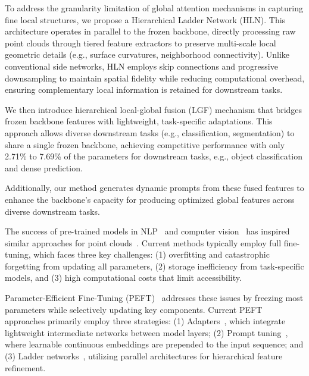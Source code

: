  To address the granularity limitation of global attention mechanisms in capturing fine local structures, we propose a Hierarchical Ladder Network (HLN). This architecture operates in parallel to the frozen backbone, directly processing raw point clouds through tiered feature extractors to preserve multi-scale local geometric details (e.g., surface curvatures, neighborhood connectivity). Unlike conventional side networks, HLN employs skip connections and progressive downsampling to maintain spatial fidelity while reducing computational overhead, ensuring complementary local information is retained for downstream tasks. 

 We then introduce hierarchical local-global fusion (LGF) mechanism that bridges frozen backbone features with lightweight, task-specific adaptations. This approach allows diverse downstream tasks (e.g., classification, segmentation) to share a single frozen backbone, achieving competitive performance with only 2.71\% to 7.69\% of the parameters for downstream tasks, e.g., object classification and dense prediction.

Additionally, our method generates dynamic prompts from these fused features to enhance the backbone’s capacity for producing optimized global features across diverse downstream tasks.

The success of pre-trained models in NLP~\cite{devlin2018bert, brown2020language} and computer vision~\cite{he2020momentum, chen2020improved} has inspired similar approaches for point clouds~\cite{pang2022masked, yu2022point, zhang2022point, afham2022crosspoint}. Current methods typically employ full fine-tuning, which faces three key challenges: (1) overfitting and catastrophic forgetting from updating all parameters, (2) storage inefficiency from task-specific models, and (3) high computational costs that limit accessibility.

Parameter-Efficient Fine-Tuning (PEFT)~\cite{houlsby2019parameter, jie2023fact, karimi2021compacter} addresses these issues by freezing most parameters while selectively updating key components. Current PEFT approaches primarily employ three strategies: (1) Adapters~\cite{houlsby2019parameter, chen2022adaptformer}, which integrate lightweight intermediate networks between model layers; (2) Prompt tuning~\cite{li2021prefix, lester-etal-2021-power}, where learnable continuous embeddings are prepended to the input sequence; and (3) Ladder networks~\cite{sung2022lst}, utilizing parallel architectures for hierarchical feature refinement.

